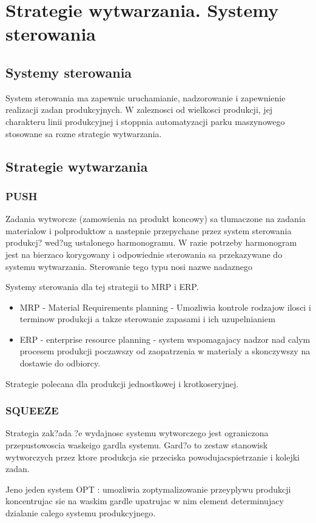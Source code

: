 \section{Strategie wytwarzania. Systemy sterowania}
\subsection{Systemy sterowania}
System sterowania ma zapewnic uruchamianie, nadzorowanie i zapewnienie realizacji zadan produkcyjnych. W zaleznosci od wielkosci produkcji, jej charakteru linii produkcyjnej i stoppnia automatyzacji parku maszynowego stosowane sa rozne strategie wytwarzania.

\subsection{Strategie wytwarzania}
\subsubsection{PUSH}
Zadania wytworcze (zamowienia na produkt koncowy) sa tlumaczone na zadania materialow i polproduktow a nastepnie przepychane przez system sterowania produkcj? wed?ug ustalonego harmonogramu. W razie potrzeby harmonogram jest na bierzaco korygowany i odpowiednie sterowania sa przekazywane do systemu wytwarzania. Sterowanie tego typu nosi nazwe nadaznego

Systemy sterowania dla tej strategii to MRP i ERP.
\begin{itemize}
\item MRP - Material Requirements planning -  Umozliwia kontrole rodzajow ilosci i terminow produkcji a takze sterowanie zapasami i ich uzupelnianiem
\item ERP - enterprise resource planning - system wspomagajacy nadzor nad calym procesem produkcji poczawszy od zaopatrzenia w materialy a skonczywszy na dostawie do odbiorcy.
\end{itemize}

Strategie polecana dla produkcji jednostkowej i krotkoseryjnej.
\subsubsection{SQUEEZE}
Strategia zak?ada ?e wydajnosc systemu wytworczego jest ograniczona przepustowoscia waskeigo gardla systemu. Gard?o to zestaw stanowisk wytworczych przez ktore produkcja sie przeciska powodujacspietrzanie i kolejki zadan.

Jeno jeden system OPT : 
umozliwia zoptymalizowanie przeyplywu produkcji koncentrujac sie na waskim gardle upatrujac w nim element determinujacy dzialanie calego systemu produkcyjnego.

